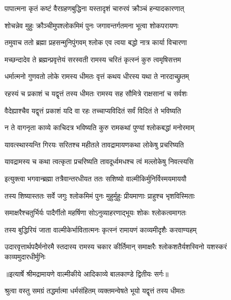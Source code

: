 \twolineshloka
{पापात्मना कृतं कष्टं वैरग्रहणबुद्धिना}
{यस्तादृशं चारुरवं क्रौञ्चं हन्यादकारणात्} %

\twolineshloka
{शोचन्नेव मुहुः क्रौञ्चीमुपश्लोकमिमं पुनः}
{जगावन्तर्गतमना भूत्वा शोकपरायणः} %

\twolineshloka
{तमुवाच ततो ब्रह्मा प्रहसन्मुनिपुंगवम्}
{श्लोक एव त्वया बद्धो नात्र कार्या विचारणा} %

\twolineshloka
{मच्छन्दादेव ते ब्रह्मन्प्रवृत्तेयं सरस्वती}
{रामस्य चरितं कृत्स्नं कुरु त्वमृषिसत्तम} %

\twolineshloka
{धर्मात्मनो गुणवतो लोके रामस्य धीमतः}
{वृत्तं कथय धीरस्य यथा ते नारदाच्छ्रुतम्} %

\twolineshloka
{रहस्यं च प्रकाशं च यद्वृत्तं तस्य धीमतः}
{रामस्य सह सौमित्रे राक्षसानां च सर्वशः} %

\twolineshloka
{वैदेह्याश्चैव यद्वृत्तं प्रकाशं यदि वा रहः}
{तच्चाप्यविदितं सर्वं विदितं ते भविष्यति} %

\twolineshloka
{न ते वागनृता काव्ये काचिदत्र भविष्यति}
{कुरु रामकथां पुण्यां श्लोकबद्धां मनोरमाम्} %

\twolineshloka
{यावत्स्थास्यन्ति गिरयः सरितश्च महीतले}
{तावद्रामायणकथा लोकेषु प्रचरिष्यति} %

\twolineshloka
{यावद्रामस्य च कथा त्वत्कृता प्रचरिष्यति}
{तावदूर्ध्वमधश्च त्वं मल्लोकेषु निवत्स्यसि} %

\twolineshloka
{इत्युक्त्वा भगवान्ब्रह्मा तत्रैवान्तरधीयत}
{ततः सशिष्यो वाल्मीकिर्मुनिर्विस्मयमाययौ} %

\twolineshloka
{तस्य शिष्यास्ततः सर्वे जगुः श्लोकमिमं पुनः}
{मुहुर्मुहुः प्रीयमाणाः प्राहुश्च भृशविस्मिताः} %

\twolineshloka
{समाक्षरैश्चतुर्भिर्यः पादैर्गीतो महर्षिणा}
{सोऽनुव्याहरणाद्भूयः शोकः श्लोकत्वमागतः} %

\twolineshloka
{तस्य बुद्धिरियं जाता वाल्मीकेर्भावितात्मनः}
{कृत्स्नं रामायणं काव्यमीदृशैः करवाण्यहम्} %

\fourlineindentedshloka
{उदारवृत्तार्थपदैर्मनोरमै}
{स्तदास्य रामस्य चकार कीर्तिमान्}
{समाक्षरैः श्लोकशतैर्यशस्विनो}
{ यशस्करं काव्यमुदारधीर्मुनिः} %


{॥इत्यार्षे श्रीमद्रामायणे वाल्मीकीये आदिकाव्ये बालकाण्डे द्वितीयः सर्गः॥}


\twolineshloka
{श्रुत्वा वस्तु समग्रं तद्धर्मात्मा धर्मसंहितम्}
{व्यक्तमन्वेषते भूयो यद्वृत्तं तस्य धीमतः} %

